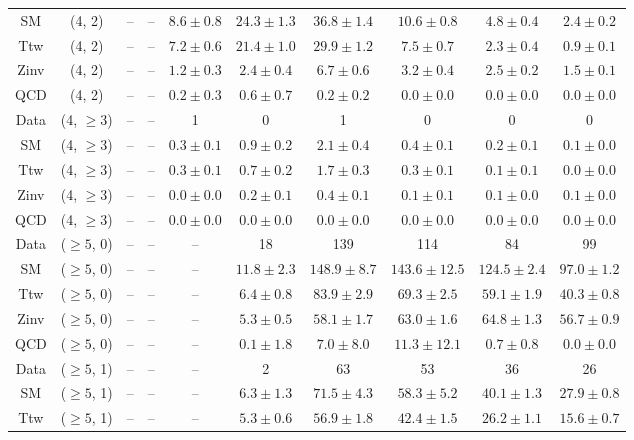 \begin{table}[h!]
{\begin{tabular}{cccccccccc}
	SM & (4, 2) & -- & -- & $8.6\pm 0.8$ & $24.3\pm 1.3$ & $36.8\pm 1.4$ & $10.6\pm 0.8$ & $4.8\pm 0.4$ & $2.4\pm 0.2$ \\[0.5ex] 
	Ttw & (4, 2) & -- & -- & $7.2\pm 0.6$ & $21.4\pm 1.0$ & $29.9\pm 1.2$ & $7.5\pm 0.7$ & $2.3\pm 0.4$ & $0.9\pm 0.1$ \\[0.5ex] 
	Zinv & (4, 2) & -- & -- & $1.2\pm 0.3$ & $2.4\pm 0.4$ & $6.7\pm 0.6$ & $3.2\pm 0.4$ & $2.5\pm 0.2$ & $1.5\pm 0.1$ \\[0.5ex] 
	QCD & (4, 2) & -- & -- & $0.2\pm 0.3$ & $0.6\pm 0.7$ & $0.2\pm 0.2$ & $0.0\pm 0.0$ & $0.0\pm 0.0$ & $0.0\pm 0.0$ \\[0.5ex] 
	Data & (4, $\ge3$) & -- & -- & 1 & 0 & 1 & 0 & 0 & 0 \\[0.5ex] 
	SM & (4, $\ge3$) & -- & -- & $0.3\pm 0.1$ & $0.9\pm 0.2$ & $2.1\pm 0.4$ & $0.4\pm 0.1$ & $0.2\pm 0.1$ & $0.1\pm 0.0$ \\[0.5ex] 
	Ttw & (4, $\ge3$) & -- & -- & $0.3\pm 0.1$ & $0.7\pm 0.2$ & $1.7\pm 0.3$ & $0.3\pm 0.1$ & $0.1\pm 0.1$ & $0.0\pm 0.0$ \\[0.5ex] 
	Zinv & (4, $\ge3$) & -- & -- & $0.0\pm 0.0$ & $0.2\pm 0.1$ & $0.4\pm 0.1$ & $0.1\pm 0.1$ & $0.1\pm 0.0$ & $0.1\pm 0.0$ \\[0.5ex] 
	QCD & (4, $\ge3$) & -- & -- & $0.0\pm 0.0$ & $0.0\pm 0.0$ & $0.0\pm 0.0$ & $0.0\pm 0.0$ & $0.0\pm 0.0$ & $0.0\pm 0.0$ \\[0.5ex] 
	Data & ($\ge5$, 0) & -- & -- & -- & 18 & 139 & 114 & 84 & 99 \\[0.5ex] 
	SM & ($\ge5$, 0) & -- & -- & -- & $11.8\pm 2.3$ & $148.9\pm 8.7$ & $143.6\pm 12.5$ & $124.5\pm 2.4$ & $97.0\pm 1.2$ \\[0.5ex] 
	Ttw & ($\ge5$, 0) & -- & -- & -- & $6.4\pm 0.8$ & $83.9\pm 2.9$ & $69.3\pm 2.5$ & $59.1\pm 1.9$ & $40.3\pm 0.8$ \\[0.5ex] 
	Zinv & ($\ge5$, 0) & -- & -- & -- & $5.3\pm 0.5$ & $58.1\pm 1.7$ & $63.0\pm 1.6$ & $64.8\pm 1.3$ & $56.7\pm 0.9$ \\[0.5ex] 
	QCD & ($\ge5$, 0) & -- & -- & -- & $0.1\pm 1.8$ & $7.0\pm 8.0$ & $11.3\pm 12.1$ & $0.7\pm 0.8$ & $0.0\pm 0.0$ \\[0.5ex] 
	Data & ($\ge5$, 1) & -- & -- & -- & 2 & 63 & 53 & 36 & 26 \\[0.5ex] 
	SM & ($\ge5$, 1) & -- & -- & -- & $6.3\pm 1.3$ & $71.5\pm 4.3$ & $58.3\pm 5.2$ & $40.1\pm 1.3$ & $27.9\pm 0.8$ \\[0.5ex] 
	Ttw & ($\ge5$, 1) & -- & -- & -- & $5.3\pm 0.6$ & $56.9\pm 1.8$ & $42.4\pm 1.5$ & $26.2\pm 1.1$ & $15.6\pm 0.7$ \\[0.5ex] 

\end{tabular}}
\end{table}
